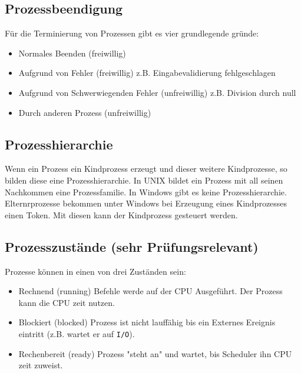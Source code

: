 \subsection{Prozessbeendigung}

Für die Terminierung von Prozessen gibt es vier grundlegende gründe:

\begin{itemize}
    \item Normales Beenden (freiwillig)
    \item Aufgrund von Fehler (freiwillig) \newline z.B. Eingabevalidierung
          fehl\-ge\-schlagen
    \item Aufgrund von Schwerwiegenden Fehler (unfreiwillig) \newline z.B. Di\-vi\-sion
          durch null
    \item Durch anderen Prozess (unfreiwillig)
\end{itemize}

\subsection{Prozesshierarchie}

Wenn ein Prozess ein Kindprozess erzeugt und dieser weitere Kindprozesse, so
bilden diese eine Prozesshierarchie. In UNIX bildet ein Prozess mit all seinen
Nachkommen eine Prozessfamilie. In Windows gibt es keine Prozesshierarchie.
Elternrprozesse bekommen unter Windows bei Erzeugung eines Kindprozesses einen
Token. Mit diesen kann der Kindprozess gesteuert werden.

\subsection{Prozesszustände (sehr Prüfungsrelevant)}

Prozesse können in einen von drei Zuständen sein:

\begin{itemize}
    \item Rechnend (running) Befehle werde auf der CPU Ausgeführt. Der Pro\-zess kann die
          CPU zeit nutzen.
    \item Blockiert (blocked) Prozess ist nicht lauffähig bis ein Externes Ereignis
          eintritt (z.B. wartet er auf \texttt{I/O}).
    \item Rechenbereit (ready) Prozess "steht an" und wartet, bis Scheduler ihn CPU zeit
          zuweist.
\end{itemize}

